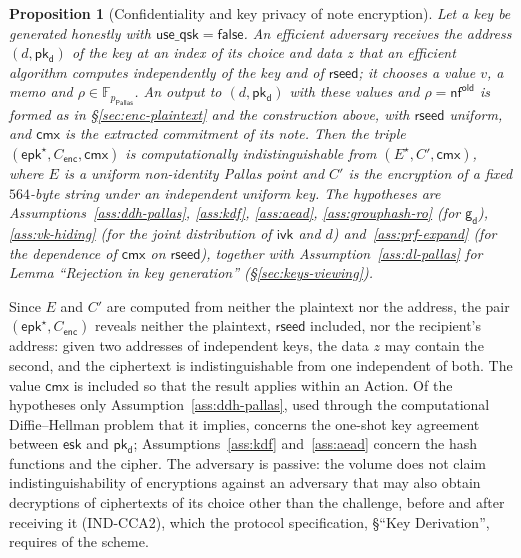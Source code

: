 \documentclass[11pt,a4paper]{article}
\newtheorem{proposition}[theorem]{Proposition}
\theoremstyle{definition}
\newcommand{\F}{\mathbb{F}}
\newcommand{\nfsym}{\mathsf{nf}}
\newcommand{\cmx}{\mathsf{cmx}}
\newcommand{\Pallas}{\ensuremath{\mathsf{Pallas}}}
\newcommand{\ivk}{\ensuremath{\mathsf{ivk}}}
\newcommand{\pkd}{\ensuremath{\mathsf{pk_d}}}
\newcommand{\gd}{\ensuremath{\mathsf{g_d}}}
\begin{document}
\begin{proposition}[Confidentiality and key privacy of note encryption]%
\label{prop:enc-privacy}
Let a key be generated honestly with $\mathsf{use\_qsk} = \mathsf{false}$. An
efficient adversary receives the address $(d, \pkd)$ of the key at an index
of its choice and data $z$ that an efficient algorithm computes independently
of the key and of $\mathsf{rseed}$; it chooses a value $v$, a memo and
$\rho \in \F_{p_{\Pallas}}$. An output to $(d, \pkd)$ with these values and
$\rho = \nfsym^{\mathsf{old}}$ is formed as in \S\ref{sec:enc-plaintext} and
the construction above, with $\mathsf{rseed}$ uniform, and $\cmx$ is the
extracted commitment of its note. Then the triple
$(\mathsf{epk}^{\star}, C_{\mathsf{enc}}, \cmx)$ is computationally
indistinguishable from $(E^{\star}, C', \cmx)$, where $E$ is a uniform
non-identity Pallas point and $C'$ is the encryption of a fixed $564$-byte
string under an independent uniform key. The hypotheses are
Assumptions~\ref{ass:ddh-pallas}, \ref{ass:kdf}, \ref{ass:aead},
\ref{ass:grouphash-ro} (for $\gd$), \ref{ass:vk-hiding} (for the joint
distribution of $\ivk$ and $d$) and~\ref{ass:prf-expand} (for the dependence
of $\cmx$ on $\mathsf{rseed}$), together with Assumption~\ref{ass:dl-pallas}
for Lemma ``Rejection in key generation'' (\S\ref{sec:keys-viewing}).
\end{proposition}

Since $E$ and $C'$ are computed from neither the plaintext nor the address,
the pair $(\mathsf{epk}^{\star}, C_{\mathsf{enc}})$ reveals neither the
plaintext, $\mathsf{rseed}$ included, nor the recipient's address: given two
addresses of independent keys, the data $z$ may contain the second, and the
ciphertext is indistinguishable from one independent of both. The value
$\cmx$ is included so that the result applies within an Action. Of the
hypotheses only Assumption~\ref{ass:ddh-pallas}, used through the
computational Diffie--Hellman problem that it implies, concerns the one-shot
key agreement between $\mathsf{esk}$ and $\pkd$; Assumptions~\ref{ass:kdf}
and~\ref{ass:aead} concern the hash functions and the cipher. The adversary
is passive: the volume does not claim indistinguishability of encryptions
against an adversary that may also obtain decryptions of ciphertexts of its
choice other than the challenge, before and after receiving it (IND-CCA2),
which the protocol specification, \S``Key Derivation'', requires of the
scheme.
\end{document}
